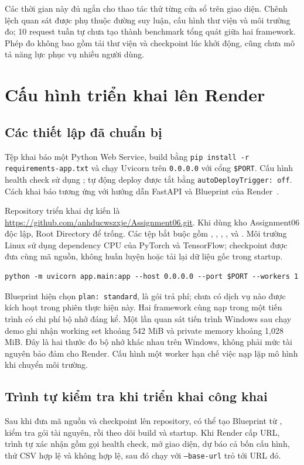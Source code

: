 \documentclass[12pt,a4paper]{report}
\begin{document}
Các thời gian này đủ ngắn cho thao tác thử từng cửa sổ trên giao diện. Chênh lệch quan sát được phụ thuộc đường suy luận, cấu hình thư viện và môi trường đo; 10 request tuần tự chưa tạo thành benchmark tổng quát giữa hai framework. Phép đo không bao gồm tải thư viện và checkpoint lúc khởi động, cũng chưa mô tả năng lực phục vụ nhiều người dùng.

\section{Cấu hình triển khai lên Render}
\subsection{Các thiết lập đã chuẩn bị}
Tệp  khai báo một Python Web Service, build bằng \texttt{pip install -r requirements-app.txt} và chạy Uvicorn trên \texttt{0.0.0.0} với cổng \texttt{\$PORT}. Cấu hình health check sử dụng ; tự động deploy được tắt bằng \texttt{autoDeployTrigger: off}. Cách khai báo tương ứng với hướng dẫn FastAPI và Blueprint của Render~\cite{render-fastapi,render-blueprint}.

Repository triển khai dự kiến là \url{https://github.com/anhducwszxje/Assignment06.git}. Khi dùng kho Assignment06 độc lập, Root Directory để trống. Các tệp bắt buộc gồm , , , ,  và . Môi trường Linux sử dụng dependency CPU của PyTorch và TensorFlow; checkpoint được đưa cùng mã nguồn, không huấn luyện hoặc tải lại dữ liệu gốc trong startup.

\begin{lstlisting}[language={},caption={Lệnh khởi động Web Service được khai báo cho Render.}]
python -m uvicorn app.main:app --host 0.0.0.0 --port $PORT --workers 1
\end{lstlisting}

Blueprint hiện chọn \texttt{plan: standard}, là gói trả phí; chưa có dịch vụ nào được kích hoạt trong phiên thực hiện này. Hai framework cùng nạp trong một tiến trình có chi phí bộ nhớ đáng kể. Một lần quan sát tiến trình Windows sau chạy demo ghi nhận working set khoảng 542 MiB và private memory khoảng 1,028 MiB. Đây là hai thước đo bộ nhớ khác nhau trên Windows, không phải mức tài nguyên bảo đảm cho Render. Cấu hình một worker hạn chế việc nạp lặp mô hình khi chuyển môi trường.

\subsection{Trình tự kiểm tra khi triển khai công khai}
Sau khi đưa mã nguồn và checkpoint lên repository, có thể tạo Blueprint từ , kiểm tra gói tài nguyên, rồi theo dõi build và startup. Khi Render cấp URL, trình tự xác nhận gồm gọi health check, mở giao diện, dự báo cả bốn cấu hình, thử CSV hợp lệ và không hợp lệ, sau đó chạy  với \texttt{--base-url} trỏ tới URL đó.
\end{document}
